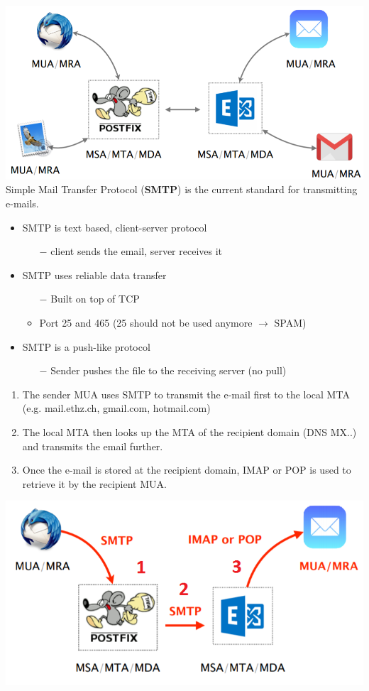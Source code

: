 \documentclass[a4paper, fontsize=8pt, landscape, DIV=1]{scrartcl}
\begin{document}
\begin{multicols*}{4}
		\includegraphics[width=\columnwidth]{images/Application_Layer/email_package.png}
		Simple Mail Transfer Protocol (\textbf{SMTP}) is the current standard for
		transmitting e-mails.
		\begin{itemize}[noitemsep]
			\item SMTP is text based, client-server protocol 
			\begin{itemize}
				\item[$-$] client sends the email, server receives it
			\end{itemize}
			\item SMTP uses reliable data transfer
			\begin{itemize}
				\item[$-$] Built on top of TCP 
				\item Port 25 and 465 (25 should not be used anymore $\rightarrow$ SPAM)
			\end{itemize}
			\item SMTP is a push-like protocol 
			\begin{itemize}
				\item[$-$] Sender pushes the file to the receiving server (no pull)
			\end{itemize}
		\end{itemize} 
		\begin{enumerate}
			\item The sender MUA uses SMTP to transmit the e-mail first to the local MTA
			(e.g. mail.ethz.ch, gmail.com, hotmail.com)
			\item The local MTA then looks up the MTA of the recipient domain (DNS MX..)
			and transmits the email further.
			\item Once the e-mail is stored at the recipient domain, IMAP or POP is used
			to retrieve it by the recipient MUA. 
		\end{enumerate}
		\includegraphics[width=\columnwidth]{images/Application_Layer/email_way.png}

\end{multicols*}
\end{document}
